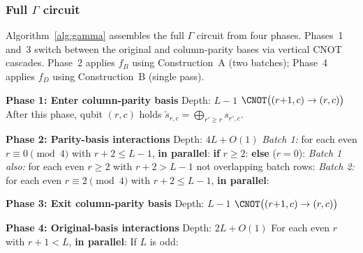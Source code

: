 \subsubsection{Full $\Gamma$ circuit}
\label{sec:gamma-circuit}

Algorithm~\ref{alg:gamma} assembles the full $\Gamma$ circuit from four phases.
Phases~1 and~3 switch between the original and column-parity bases via vertical CNOT cascades.
Phase~2 applies $f_B$ using Construction~A (two batches); Phase~4 applies $f_D$ using Construction~B (single pass).

\begin{algorithm}[t]
\caption{\textsc{ApplyGamma}: ancilla-free $\Gamma$ on $L \times L$ grid}
\label{alg:gamma}
\begin{algorithmic}[1]

\Statex \textbf{Phase 1: Enter column-parity basis} \hfill Depth: $L{-}1$
    \State $\CNOT\bigl((r{+}1,c) \to (r,c)\bigr)$
  \EndFor
\EndFor
\Statex \hspace{1em} After this phase, qubit $(r,c)$ holds $\tilde{s}_{r,c} = \bigoplus_{r' \ge r} s_{r',c}$.

\Statex
\Statex \textbf{Phase 2: Parity-basis interactions} \hfill Depth: $4L{+}O(1)$
\Statex \hspace{1em}\emph{Batch 1:} for each even $r \equiv 0 \pmod{4}$ with $r{+}2 \le L{-}1$, \textbf{in parallel}:
\State \hspace{2em}\textbf{if} $r \ge 2$: 
\State \hspace{2em}\textbf{else} ($r = 0$): 
\Statex \hspace{1em}\emph{Batch 1 also:} for each even $r \ge 2$ with $r{+}2 > L{-}1$ not overlapping batch rows:
\State \hspace{2em}
\Statex \hspace{1em}\emph{Batch 2:} for each even $r \equiv 2 \pmod{4}$ with $r{+}2 \le L{-}1$, \textbf{in parallel}:
\State \hspace{2em}

\Statex
\Statex \textbf{Phase 3: Exit column-parity basis} \hfill Depth: $L{-}1$
    \State $\CNOT\bigl((r{+}1,c) \to (r,c)\bigr)$
  \EndFor
\EndFor

\Statex
\Statex \textbf{Phase 4: Original-basis interactions} \hfill Depth: $2L{+}O(1)$
\Statex \hspace{1em}For each even $r$ with $r{+}1 < L$, \textbf{in parallel}:
\State \hspace{2em}
\Statex \hspace{1em}If $L$ is odd: 

\end{algorithmic}
\end{algorithm}


